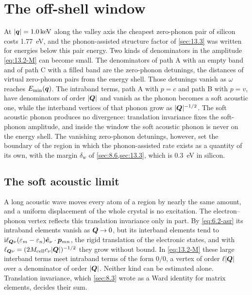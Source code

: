 \section{The off-shell window}\label{sec:13.6}

At $|\bm{q}| = \SI{1.0}{keV}$ along the valley axis the cheapest zero-phonon pair of silicon costs \SI{1.77}{eV}, and the phonon-assisted structure factor of \cref{sec:13.3} was written for energies below this pair energy. Two kinds of denominators in the amplitude \cref{eq:13.2-M} can become small. The denominators of path A with an empty band and of path C with a filled band are the zero-phonon detunings, the distances of virtual zero-phonon pairs from the energy shell. Those detunings vanish as $\omega$ reaches $E_{\mathrm{min}}(\bm{q})$. The intraband terms, path A with $p = c$ and path B with $p = v$, have denominators of order $|\bm{Q}|$ and vanish as the phonon becomes a soft acoustic one, while the interband vertices of that phonon grow as $|\bm{Q}|^{-1/2}$. The soft acoustic phonon produces no divergence: translation invariance fixes the soft-phonon amplitude, and inside the window the soft acoustic phonon is never on the energy shell. The vanishing zero-phonon detunings, however, set the boundary of the region in which the phonon-assisted rate exists as a quantity of its own, with the margin $\delta_{\mathrm{w}}$ of \cref{sec:8.6,sec:13.3}, which is \SI{0.3}{eV} in silicon.

\subsection{The soft acoustic limit}

A long acoustic wave moves every atom of a region by nearly the same amount, and a uniform displacement of the whole crystal is no excitation. The electron--phonon vertex reflects this translation invariance only in part. By \cref{eq:6.2-asr} its intraband elements vanish as $\bm{Q}\to0$, but its interband elements tend to $\mathrm{i}\ell_{\bm{Q}\nu}(\varepsilon_m - \varepsilon_n)\hat{\bm{e}}_\nu\cdot\bm{p}_{mn}$, the rigid translation of the electronic states, and with $\ell_{\bm{Q}\nu} = (2M_{\mathrm{cell}}c_\nu|\bm{Q}|)^{-1/2}$ they grow without bound. In \cref{eq:13.2-M} these large interband terms meet intraband terms of the form $0/0$, a vertex of order $\ell|\bm{Q}|$ over a denominator of order $|\bm{Q}|$. Neither kind can be estimated alone. Translation invariance, which \cref{sec:8.3} wrote as a Ward identity for matrix elements, decides their sum.

